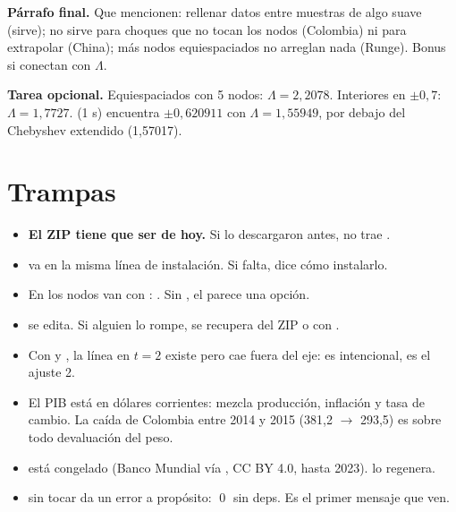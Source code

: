 \begin{preguntas}
\end{preguntas}

\textbf{Párrafo final.} Que mencionen: rellenar datos entre muestras de algo suave (sirve); no sirve para choques que no tocan los nodos (Colombia) ni para extrapolar (China); más nodos equiespaciados no arreglan nada (Runge). Bonus si conectan con $\Lambda$.

\textbf{Tarea opcional.} Equiespaciados con 5 nodos: $\Lambda=2{,}2078$. Interiores en $\pm0{,}7$: $\Lambda=1{,}7727$.  (1 s) encuentra $\pm0{,}620911$ con $\Lambda=1{,}55949$, por debajo del Chebyshev extendido (1,57017).

\section{Trampas}
\begin{itemize}
\item \textbf{El ZIP tiene que ser de hoy.} Si lo descargaron antes, no trae .
\item {} va en la misma línea de instalación. Si falta,  dice cómo instalarlo.
\item En  los nodos van con \codigo{=}: . Sin \codigo{=}, el  parece una opción.
\item {} se edita. Si alguien lo rompe, se recupera del ZIP o con .
\item Con  y , la línea en $t=2$ existe pero cae fuera del eje: es intencional, es el ajuste 2.
\item El PIB está en dólares corrientes: mezcla producción, inflación y tasa de cambio. La caída de Colombia entre 2014 y 2015 (381,2 $\to$ 293,5) es sobre todo devaluación del peso.
\item {} está congelado (Banco Mundial vía , CC BY 4.0, hasta 2023).  lo regenera.
\item {} sin tocar da un error a propósito: \qed{} sin deps. Es el primer mensaje que ven.
\end{itemize}

